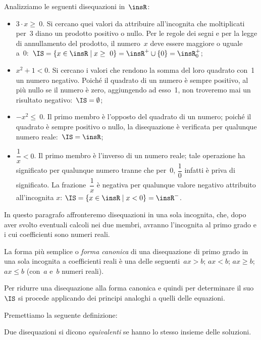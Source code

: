  \begin{exrig}
  \begin{esempio}
   Analizziamo le seguenti disequazioni in~$\insR$:


\begin{itemize}
\item $3\cdot x\ge~0$. Si cercano quei valori da attribuire
all'incognita che moltiplicati per~3 diano un prodotto
positivo o nullo. Per le regole dei segni e per la legge di
annullamento del prodotto, il numero~$x$ deve essere maggiore o uguale
a~0:~$\IS=\{x\in \insR\mid x\ge~0\}=\insR^{+}\cup\{0\}=\insR^{+}_0$;
\item $x^{2}+1<0$. Si cercano i valori che rendono la somma del loro
quadrato con~1 un numero negativo. Poiché il quadrato di un numero
è sempre positivo, al più nullo se il numero è zero, aggiungendo
ad esso~1, non troveremo mai un risultato negativo:~$\IS=\emptyset $;
\item $-x^{2}\le~0$. Il primo membro è l'opposto del
quadrato di un numero; poiché il quadrato è sempre positivo o
nullo, la disequazione è verificata per qualunque numero reale:~$\IS=\insR$;
\item $\dfrac{1}{x}<0$. Il primo membro è l'inverso di
un numero reale; tale operazione ha significato per qualunque numero
tranne che per~0, $\dfrac{1}{0}$ infatti è priva di significato. La
frazione~$\dfrac{1}{x}$ è negativa per qualunque valore negativo
attribuito all'incognita $x$: $\IS=\{x\in\insR\mid x<0\}=\insR^{-}$.
\end{itemize}
  \end{esempio}
 \end{exrig}

In questo paragrafo affronteremo disequazioni in una sola incognita,
che, dopo aver svolto eventuali calcoli nei due membri, avranno
l'incognita al primo grado e i cui coefficienti sono
numeri reali.

La forma più semplice o \emph{forma canonica} di una disequazione di
primo grado in una sola incognita a coefficienti reali è una delle
seguenti~$ax>b$; $ax<b$; $ax\ge b$; $ax\le b$ (con~$a$ e~$b$ numeri reali).

Per ridurre una disequazione alla forma canonica e quindi per
determinare il suo~$\IS$ si procede applicando dei principi analoghi a
quelli delle equazioni.

Premettiamo la seguente definizione:

\begin{definizione}
Due disequazioni si dicono \emph{equivalenti} se hanno lo
stesso insieme delle soluzioni.
\end{definizione}

